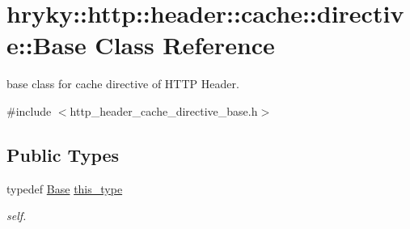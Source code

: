 \hypertarget{classhryky_1_1http_1_1header_1_1cache_1_1directive_1_1_base}{\section{hryky\-:\-:http\-:\-:header\-:\-:cache\-:\-:directive\-:\-:Base Class Reference}
\label{classhryky_1_1http_1_1header_1_1cache_1_1directive_1_1_base}
}


base class for cache directive of H\-T\-T\-P Header.  




{\ttfamily \#include $<$http\-\_\-header\-\_\-cache\-\_\-directive\-\_\-base.\-h$>$}

\subsection*{Public Types}
\begin{DoxyCompactItemize}
\item 
\hypertarget{classhryky_1_1http_1_1header_1_1cache_1_1directive_1_1_base_a9bbcc0e5a77bd95f0b2482502287720e}{typedef \hyperlink{classhryky_1_1http_1_1header_1_1cache_1_1directive_1_1_base}{Base} \hyperlink{classhryky_1_1http_1_1header_1_1cache_1_1directive_1_1_base_a9bbcc0e5a77bd95f0b2482502287720e}{this\-\_\-type}}\label{classhryky_1_1http_1_1header_1_1cache_1_1directive_1_1_base_a9bbcc0e5a77bd95f0b2482502287720e}

\begin{DoxyCompactList}\small\item\em self. \end{DoxyCompactList}\end{DoxyCompactItemize}
